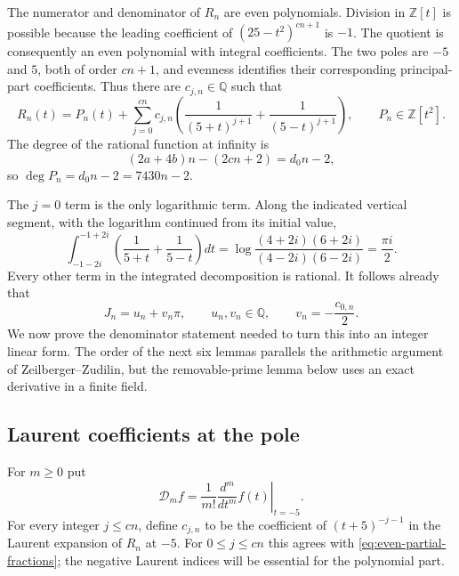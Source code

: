\documentclass[11pt,reqno,letterpaper]{amsart}
\numberwithin{equation}{section}
\theoremstyle{definition}
\theoremstyle{remark}
\begin{document}
The numerator and denominator of $R_n$ are even polynomials.  Division
in $\mathbb Z[t]$ is possible because the leading coefficient of
$(25-t^2)^{cn+1}$ is $-1$.  The quotient is consequently an even
polynomial with integral coefficients.  The two poles are $-5$ and $5$,
both of order $cn+1$, and evenness identifies their corresponding
principal-part coefficients.  Thus there are $c_{j,n}\in\mathbb Q$ such
that
\begin{equation}\label{eq:even-partial-fractions}
 R_n(t)=P_n(t)+\sum_{j=0}^{cn}c_{j,n}
 \left(\frac1{(5+t)^{j+1}}+\frac1{(5-t)^{j+1}}\right),
 \qquad P_n\in\mathbb Z[t^2].
\end{equation}
The degree of the rational function at infinity is
\[
 (2a+4b)n-(2cn+2)=d_0n-2,
\]
so $\deg P_n=d_0n-2=7430n-2$.

The $j=0$ term is the only logarithmic term.  Along the indicated
vertical segment, with the logarithm continued from its initial value,
\begin{equation}\label{eq:logarithmic-integral}
 \int_{-1-2i}^{-1+2i}
 \left(\frac1{5+t}+\frac1{5-t}\right)dt
 =\log\frac{(4+2i)(6+2i)}{(4-2i)(6-2i)}
 =\frac{\pi i}{2}.
\end{equation}
Every other term in the integrated decomposition is rational.  It follows
already that
\begin{equation}\label{eq:rational-linear-form}
 J_n=u_n+v_n\pi,
 \qquad u_n,v_n\in\mathbb Q,
 \qquad v_n=-\frac{c_{0,n}}2.
\end{equation}
We now prove the denominator statement needed to turn this into an integer
linear form.  The order of the next six lemmas parallels the arithmetic
argument of Zeilberger--Zudilin, but the removable-prime lemma below uses
an exact derivative in a finite field.

\subsection{Laurent coefficients at the pole}

For $m\geq0$ put
\[
 \mathcal D_m f=\left.\frac1{m!}\frac{d^m}{dt^m}f(t)\right|_{t=-5}.
\]
For every integer $j\leq cn$, define $c_{j,n}$ to be the coefficient of
$(t+5)^{-j-1}$ in the Laurent expansion of $R_n$ at $-5$.  For
$0\leq j\leq cn$ this agrees with \eqref{eq:even-partial-fractions}; the
negative Laurent indices will be essential for the polynomial part.
\end{document}
